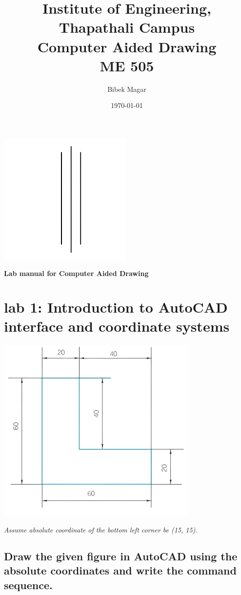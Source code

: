 \documentclass[a4paper, 12pt]{article}
\title{Institute of Engineering,\\ Thapathali Campus \\ Computer Aided Drawing \\ ME 505} %
\author{Bibek Magar}
\date{\today} %
\begin{document}
\maketitle %
	\begin{center}
		\includegraphics{gfx/lines.png}
	\end{center}
	\begin{center}
		\textbf{Lab manual for Computer Aided Drawing}
	\end{center}
	
	\newpage

\section{lab 1: Introduction to AutoCAD interface and coordinate systems}
\begin{center}
	\includegraphics{gfx/fig.png}
\end{center}
\emph{Assume absolute coordinate of the bottom left corner be (15, 15).}
\subsection{Draw the given figure in AutoCAD using the absolute coordinates and write the command sequence.}
\end{document}
